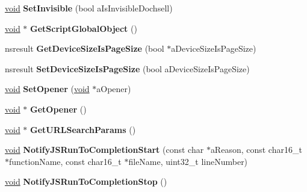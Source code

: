 \begin{DoxyCompactItemize}
\hyperlink{interfacevoid}{void} {\bfseries Set\+Invisible} (bool a\+Is\+Invisible\+Dochsell)
\item 
\mbox{\label{interfacens_i_doc_shell_a2c03c410b6fb64294befa049b9be7a99}} 
\hyperlink{interfacevoid}{void} $\ast$ {\bfseries Get\+Script\+Global\+Object} ()
\item 
\mbox{\label{interfacens_i_doc_shell_a2ac784ef51cd771a5badda22a6684d6c}} 
nsresult {\bfseries Get\+Device\+Size\+Is\+Page\+Size} (bool $\ast$a\+Device\+Size\+Is\+Page\+Size)
\item 
\mbox{\label{interfacens_i_doc_shell_a6f575ecb095cc649678abe106181f00e}} 
nsresult {\bfseries Set\+Device\+Size\+Is\+Page\+Size} (bool a\+Device\+Size\+Is\+Page\+Size)
\item 
\mbox{\label{interfacens_i_doc_shell_a86fce369ec236d3b1544b49865ef3450}} 
\hyperlink{interfacevoid}{void} {\bfseries Set\+Opener} (\hyperlink{interfacevoid}{void} $\ast$a\+Opener)
\item 
\mbox{\label{interfacens_i_doc_shell_ada1279ff3c42fdcbb6b097210964f410}} 
\hyperlink{interfacevoid}{void} $\ast$ {\bfseries Get\+Opener} ()
\item 
\mbox{\label{interfacens_i_doc_shell_a899c4466e988578231406ce3b2d017da}} 
\hyperlink{interfacevoid}{void} $\ast$ {\bfseries Get\+U\+R\+L\+Search\+Params} ()
\item 
\mbox{\label{interfacens_i_doc_shell_ad6acfd64a1aa134e7f2ccd3aed3b3ed4}} 
\hyperlink{interfacevoid}{void} {\bfseries Notify\+J\+S\+Run\+To\+Completion\+Start} (const char $\ast$a\+Reason, const char16\+\_\+t $\ast$function\+Name, const char16\+\_\+t $\ast$file\+Name, uint32\+\_\+t line\+Number)
\item 
\mbox{\label{interfacens_i_doc_shell_a0b2f8aa24cd87dbdda0c5106040ded7b}} 
\hyperlink{interfacevoid}{void} {\bfseries Notify\+J\+S\+Run\+To\+Completion\+Stop} ()
\item 
\mbox{\label{interfacens_i_doc_shell_aa65d02d6f65bbd4010669593eb4df5af}} 

\end{DoxyCompactItemize}
